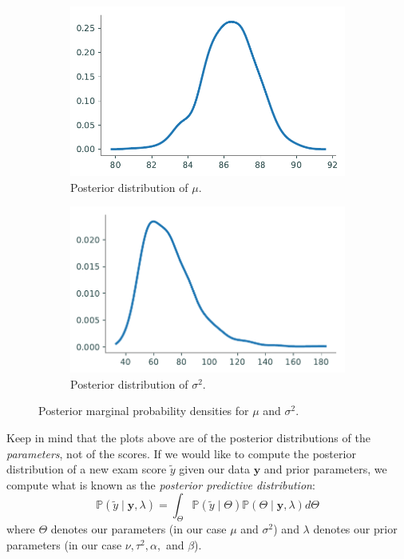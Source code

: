 \begin{figure}[H]
    \begin{subfigure}[b]{.49\textwidth}
        \includegraphics[width=\textwidth]{figures/mu_posterior.pdf}
        \caption{Posterior distribution of $\mu$.}
    \end{subfigure}
    \begin{subfigure}[b]{.49\textwidth}
        \includegraphics[width=\textwidth]{figures/sigma2_posterior.pdf}
        \caption{Posterior distribution of $\sigma^2$.}
    \end{subfigure}
\caption{Posterior marginal probability densities for $\mu$ and $\sigma^2$.}
\label{fig:post}
\end{figure}

Keep in mind that the plots above are of the posterior distributions of the \emph{parameters}, not of the scores. If we would like to compute the posterior distribution of a new exam score $\tilde{y}$ given our data $\mathbf{y}$ and prior parameters, we compute what is known as the \emph{posterior predictive distribution}:
\begin{equation*}
\mathbb{P}(\tilde{y} \mid \mathbf{y}, \lambda) = \int_{\Theta} \mathbb{P}(\tilde{y} \mid \Theta)\mathbb{P}(\Theta \mid \mathbf{y}, \lambda) d\Theta
\end{equation*}
where $\Theta$ denotes our parameters (in our case $\mu$ and $\sigma^{2}$) and $\lambda$ denotes our prior parameters (in our case $\nu, \tau^{2}, \alpha,$ and $\beta$).

